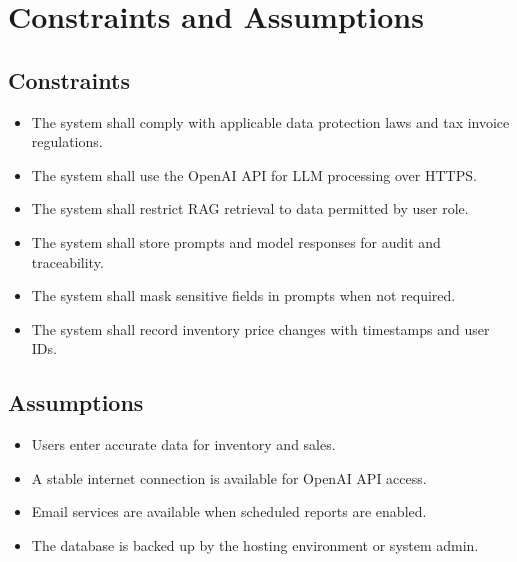 \section{Constraints and Assumptions}
\subsection{Constraints}
\begin{itemize}
    \item The system shall comply with applicable data protection laws and tax invoice regulations.
    \item The system shall use the OpenAI API for LLM processing over HTTPS.
    \item The system shall restrict RAG retrieval to data permitted by user role.
    \item The system shall store prompts and model responses for audit and traceability.
    \item The system shall mask sensitive fields in prompts when not required.
    \item The system shall record inventory price changes with timestamps and user IDs.
\end{itemize}

\subsection{Assumptions}
\begin{itemize}
    \item Users enter accurate data for inventory and sales.
    \item A stable internet connection is available for OpenAI API access.
    \item Email services are available when scheduled reports are enabled.
    \item The database is backed up by the hosting environment or system admin.
\end{itemize}
